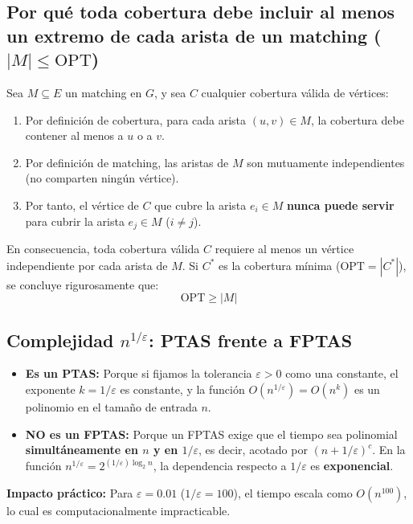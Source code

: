 \subsection{\texorpdfstring{Por qué toda cobertura debe incluir al menos un extremo de cada arista de un matching ($|M| \le \text{OPT}$)}{Por que toda cobertura incluye al menos un extremo de cada arista de un matching}}
Sea $M \subseteq E$ un matching en $G$, y sea $C$ cualquier cobertura válida de vértices:
\begin{enumerate}
    \item Por definición de cobertura, para cada arista $(u, v) \in M$, la cobertura debe contener al menos a $u$ o a $v$.
    \item Por definición de matching, las aristas de $M$ son mutuamente independientes (no comparten ningún vértice).
    \item Por tanto, el vértice de $C$ que cubre la arista $e_i \in M$ \textbf{nunca puede servir} para cubrir la arista $e_j \in M$ ($i \neq j$).
\end{enumerate}
En consecuencia, toda cobertura válida $C$ requiere al menos un vértice independiente por cada arista de $M$. Si $C^*$ es la cobertura mínima ($\text{OPT} = |C^*|$), se concluye rigurosamente que:
\begin{equation}
    \text{OPT} \ge |M|
\end{equation}

\subsection{\texorpdfstring{Complejidad $n^{1/\varepsilon}$: PTAS frente a FPTAS}{Complejidad n elevado a (1/eps): PTAS frente a FPTAS}}
\begin{itemize}
    \item \textbf{Es un PTAS:} Porque si fijamos la tolerancia $\varepsilon > 0$ como una constante, el exponente $k = 1/\varepsilon$ es constante, y la función $O(n^{1/\varepsilon}) = O(n^k)$ es un polinomio en el tamaño de entrada $n$.
    \item \textbf{NO es un FPTAS:} Porque un FPTAS exige que el tiempo sea polinomial \textbf{simultáneamente en $n$ y en $1/\varepsilon$}, es decir, acotado por $(n + 1/\varepsilon)^c$. En la función $n^{1/\varepsilon} = 2^{(1/\varepsilon) \log_2 n}$, la dependencia respecto a $1/\varepsilon$ es \textbf{exponencial}.
\end{itemize}
\noindent\textbf{Impacto práctico:} Para $\varepsilon = 0.01$ ($1/\varepsilon = 100$), el tiempo escala como $O(n^{100})$, lo cual es computacionalmente impracticable.

